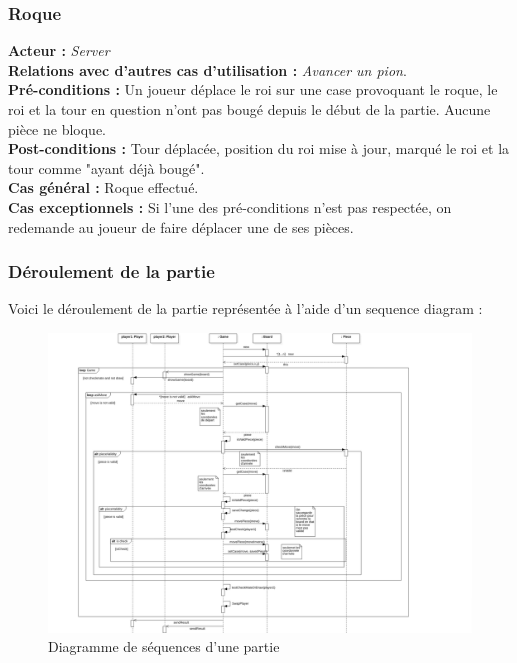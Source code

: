 \documentclass[10pt, a4paper]{article}
\begin{document}
\subsubsection{Roque}
\textbf{Acteur :} \textit{Server} \\
\textbf{Relations avec d'autres cas d'utilisation :} {\itshape Avancer un pion}. \\
\textbf{Pré-conditions :} Un joueur déplace le roi sur une case provoquant le roque, le roi et la tour en question n'ont pas bougé depuis le début de la partie. Aucune pièce ne bloque. \\
\textbf{Post-conditions :} Tour déplacée, position du roi mise à jour, marqué le roi et la tour comme "ayant déjà bougé". \\
\textbf{Cas général :} Roque effectué. \\
\textbf{Cas exceptionnels :} Si l'une des pré-conditions n'est pas respectée, on redemande au joueur de faire déplacer une de ses pièces. \\

\subsubsection{Déroulement de la partie}
Voici le déroulement de la partie représentée à l'aide d'un sequence diagram : \\

\begin{figure}[ht]
\includegraphics[scale=0.4]{SequenceDiagramClassicChessTurn.png}
\caption{Diagramme de séquences d'une partie}
\label{CD} %
\end{figure}
\clearpage
\end{document}
